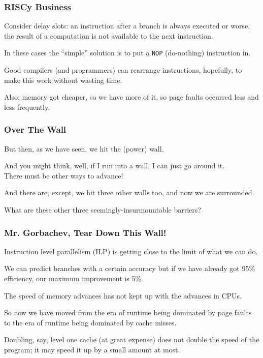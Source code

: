 \begin{frame}
\frametitle{RISCy Business}

Consider delay slots: an instruction after a branch is always executed or worse, the result of a computation is not available to the next instruction. 

In these cases the ``simple'' solution is to put a \texttt{NOP} (do-nothing) instruction in.

Good compilers (and programmers) can rearrange instructions, hopefully, to make this work without wasting time. 

Also: memory got cheaper, so we have more of it, so page faults occurred less and less frequently.


\end{frame}


\begin{frame}
\frametitle{Over The Wall}

But then, as we have seen, we hit the (power) wall. 

And you might think, well, if I run into a wall, I can just go around it.\\
\quad There must be other ways to advance! 

And there are, except, we hit three other walls too, and now we are surrounded.

What are these other three seemingly-insurmountable barriers?

\end{frame}



\begin{frame}
\frametitle{Mr. Gorbachev, Tear Down This Wall!}

Instruction level parallelism (ILP) is getting close to the limit of what we can do. 

We can predict branches with a certain accuracy but if we have already got 95\% efficiency, our maximum improvement is 5\%.

The speed of memory advances has not kept up with the advances in CPUs. 

So now we have moved from the era of runtime being dominated by page faults to the era of runtime being dominated by cache misses. 

Doubling, say, level one cache (at great expense) does not double the speed of the program; it may speed it up by a small amount at most. 

\end{frame}



